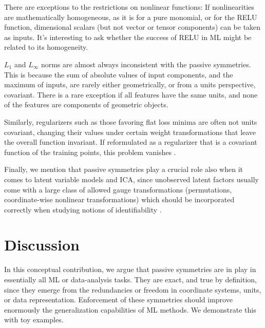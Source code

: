 \documentclass{article}
\theoremstyle{plain}
\theoremstyle{definition}
\theoremstyle{remark}
\begin{document}
There are exceptions to the restrictions on nonlinear functions:
If nonlinearities are mathematically homogeneous, as it is for a pure monomial, or for the RELU function, dimensional scalars (but not vector or tensor components) can be taken as inputs.
It's interesting to ask whether the success of RELU in ML might be related to its homogeneity.

$L_1$ and $L_\infty$ norms are almost always inconsistent with the passive symmetries.
This is because the sum of absolute values of input components, and the maximum of inputs, are rarely either geometrically, or from a units perspective, covariant.
There is a rare exception if all features have the same units, and none of the features are components of geometric objects.

Similarly, regularizers such as those favoring flat loss minima \cite{flatminima,sharpminima,petzka2021relative} are often not units covariant, changing their values under certain weight transformations that leave the overall function invariant. 
If reformulated as a regularizer that is a covariant function of the training points, this problem vanishes \cite{LuxburgBS04}.

Finally, we mention that passive symmetries play a crucial role also when it comes to latent variable models and ICA, since unobserved latent factors usually come with a large class of allowed gauge transformations (permutations, coordinate-wise nonlinear transformations) which should be incorporated correctly when studying notions of identifiability \cite{khemakhem2020ice, BucBesSch22}.

\section{Discussion}\label{sec:discussion}

In this conceptual contribution,
we argue that passive symmetries are in play in essentially all ML or data-analysis tasks.
They are exact, and true by definition, since they emerge from the redundancies or freedom in coordinate systems, units, or data representation.
Enforcement of these symmetries should improve enormously the generalization capabilities of ML methods.
We demonstrate this with toy examples.
\end{document}
